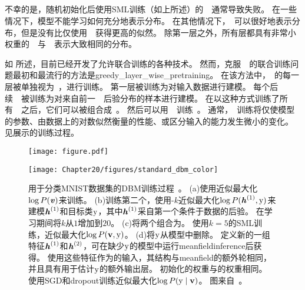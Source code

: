 \subsection{}
\label{sec:layer_wise_pretraining}

不幸的是，随机初始化后使用\gls{SML}训练（如上所述）的~~通常导致失败。
在一些情况下，模型不能学习如何充分地表示分布。
在其他情况下，~可以很好地表示分布，但是没有比仅使用~~获得更高的似然。
除第一层之外，所有层都具有非常小权重的~~与~~表示大致相同的分布。

如 所述，目前已经开发了允许联合训练的各种技术。
然而，克服~~的联合训练问题最初和最流行的方法是\gls{greedy_layer_wise_pretraining}。
在该方法中，~的每一层被单独视为~，进行训练。
第一层被训练为对输入数据进行建模。
每个后续~~被训练为对来自前一~~后验分布的样本进行建模。
在以这种方式训练了所有~~之后，它们可以被组合成~。
然后可以用~~训练~。
通常，~训练将仅使模型的参数、由数据上的对数似然衡量的性能、或区分输入的能力发生微小的变化。
见展示的训练过程。

\begin{figure}[!htb]
\ifOpenSource
\centerline{\texttt{[image: figure.pdf]}}
\else
\centerline{\texttt{[image: Chapter20/figures/standard\_dbm\_color]}}
\fi
\caption{用于分类MNIST数据集的\gls{DBM}训练过程~\citep{SalHinton09,Srivastava14}。
(a)使用近似最大化$\log P(\boldsymbol{\mathit{v}})$来训练。
(b)训练第二个，使用-$k$近似最大化$\log P(\boldsymbol{\mathit{h}}^{(1)}, \mathrm{y})$来建模$\boldsymbol{\mathit{h}}^{(1)}$和目标类$\mathrm{y}$，其中$\boldsymbol{\mathit{h}}^{(1)}$采自第一个条件于数据的后验。 在学习期间将$k$从$1$增加到$20$。
(c)将两个组合为。
使用$k = 5$的\gls{SML}训练，近似最大化$\log P(\mathbf{v}, \mathrm{y})$。
(d)将$\mathrm{y}$从模型中删除。
定义新的一组特征$\boldsymbol{\mathit{h}}^{(1)}$和$\boldsymbol{\mathit{h}}^{(2)}$，可在缺少$\mathrm{y}$的模型中运行\gls{meanfield}\gls{inference}后获得。%
使用这些特征作为的输入，其结构与\gls{meanfield}的额外轮相同，并且具有用于估计$\mathrm{y}$的额外输出层。
初始化的权重与的权重相同。
使用\gls{SGD}和\gls{dropout}训练近似最大化$\log P(\mathrm{y} \mid \mathbf{v})$。
图来自~\citet{Goodfellow-et-al-NIPS2013}。
}
\label{fig:chap20_standard_dbm_color}
\end{figure}

